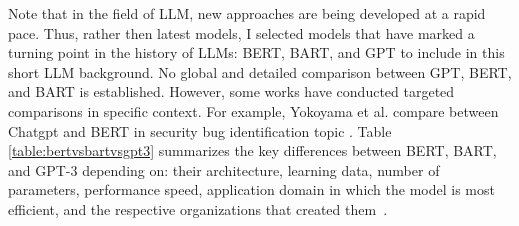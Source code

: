 Note that in the field of LLM, new approaches are being developed at a rapid pace. Thus, rather then latest models, I selected models that have marked a turning point in the history of LLMs: BERT, BART, and GPT to include in this short LLM background. No global and detailed comparison between GPT, BERT, and BART is established. However, some works have conducted targeted comparisons in specific context. For example, Yokoyama et al. compare between Chatgpt and BERT in security bug identification topic \cite{10685583}. Table \ref{table:bertvsbartvsgpt3} summarizes the key differences between BERT, BART, and GPT-3 depending on: their architecture, learning data, number of parameters, performance speed, application domain in which the model is most efficient, and the respective organizations that created them~\cite{DBLP:journals/corr/abs-2302-09419,lewis2019bartdenoisingsequencetosequencepretraining}.
